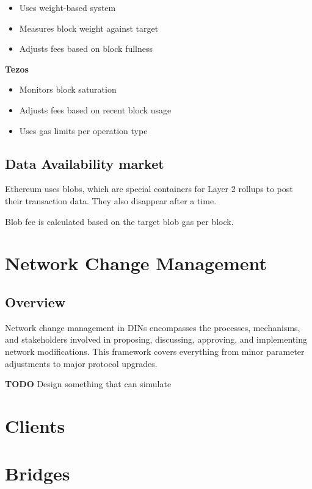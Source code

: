 \documentclass[
  letterpaper,
  DIV=11,
  numbers=noendperiod]{scrreprt}
\providecommand{\tightlist}{%
  \setlength{\itemsep}{0pt}\setlength{\parskip}{0pt}}\usepackage{longtable,booktabs,array}
\begin{document}
\begin{itemize}
\tightlist
\item
  Uses weight-based system
\item
  Measures block weight against target
\item
  Adjusts fees based on block fullness
\end{itemize}

\textbf{Tezos}

\begin{itemize}
\tightlist
\item
  Monitors block saturation
\item
  Adjusts fees based on recent block usage
\item
  Uses gas limits per operation type
\end{itemize}

\subsection{Data Availability market}\label{data-availability-market}

Ethereum uses blobs, which are special containers for Layer 2 rollups to
post their transaction data. They also disappear after a time.

Blob fee is calculated based on the target blob gas per block.

\section{Network Change Management}\label{network-change-management}

\subsection{Overview}\label{overview}

Network change management in DINs encompasses the processes, mechanisms,
and stakeholders involved in proposing, discussing, approving, and
implementing network modifications. This framework covers everything
from minor parameter adjustments to major protocol upgrades.

\textbf{TODO} Design something that can simulate

\section{Clients}\label{clients}

\section{Bridges}\label{bridges}
\end{document}
